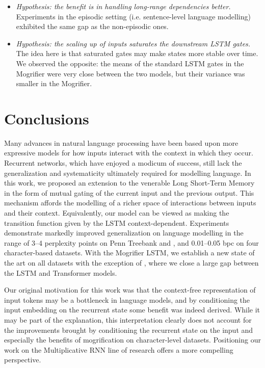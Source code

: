 \begin{itemize}
{  language.} The improvements observed on the Finnish dataset and the
  reverse copy experiments, which did not feature natural language at
  all, directly contradict this hypothesis.
\item \emph{Hypothesis: the benefit is in handling long-range
  dependencies better.} Experiments in the episodic setting (i.e.
  sentence-level language modelling) exhibited the same gap as the
  non-episodic ones.
\item \emph{Hypothesis: the scaling up of inputs saturates the
  downstream LSTM gates.} The idea here is that saturated gates may
  make states more stable over time. We observed the opposite: the
  means of the standard LSTM gates in the Mogrifier were very close
  between the two models, but their variance was smaller in the
  Mogrifier.
\end{itemize}

\section{Conclusions}

\mglconclusion
Many advances in natural language processing have been based upon more
expressive models for how inputs interact with the context in which
they occur.
%
Recurrent networks, which have enjoyed a modicum of success, still
lack the generalization and systematicity ultimately required for
modelling language.
%
In this work, we proposed an extension to the venerable Long Short-Term
Memory in the form of mutual gating of the current input and the
previous output.
%
This mechanism affords the modelling of a richer space of interactions
between inputs and their context.
%
Equivalently, our model can be viewed as making the transition
function given by the LSTM context-dependent.
%
Experiments demonstrate markedly improved generalization on language
modelling in the range of 3--4 perplexity points on Penn Treebank and
\wikitexttwo, and 0.01--0.05 bpc on four character-based datasets.
%
With the Mogrifier LSTM, we establish a new state of the art on all
datasets with the exception of \enwik, where we close a large gap
between the LSTM and Transformer models.

Our original motivation for this work was that the context-free
representation of input tokens may be a bottleneck in language models,
and by conditioning the input embedding on the recurrent state some
benefit was indeed derived.
%
While it may be part of the explanation, this interpretation clearly
does not account for the improvements brought by conditioning the
recurrent state on the input and especially the benefits of mogrification on
character-level datasets.
%
Positioning our work on the Multiplicative RNN line of research offers
a more compelling perspective.

